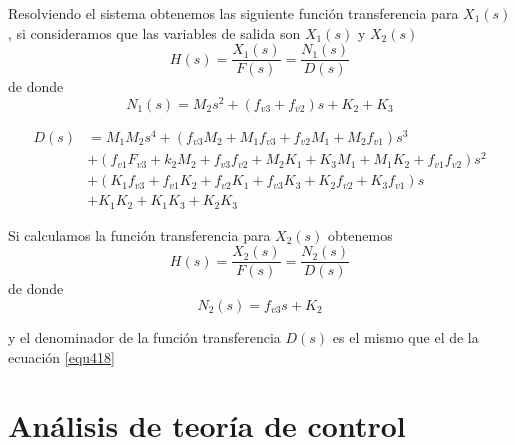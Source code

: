 \documentclass[12pt]{book}
\theoremstyle{definition}
\theoremstyle{remark}
\theoremstyle{plain}
\begin{document}
Resolviendo el sistema obtenemos las siguiente función transferencia para $X_1(s)$, si consideramos que  las variables de salida son $X_1(s)$ y $X_2(s)$
\begin{equation}
\label{euq416}
H(s)= \frac{X_1(s)}{F(s)}=\frac{N_1(s)}{D(s)}
\end{equation}
de donde
\begin{equation}
N_1(s)= M_2 s^2+(f_{v3}+f_{v2}) s +K_2+K_3
\end{equation}

\begin{equation}
\label{equ418}
\begin{split}
D(s) &= M_1 M_2 s^4 + (f_{v3} M_2+M_1 f_{v3}+f_{v2}M_1+M_2 f_{v1}) s^3 \\
&+ (f_{v1}F_{v3} +k_2 M_2+f_{v3}f_{v2}+M_2 K_1+K_3 M_1+M_1 K_2+f_{v1} f_{v2}) s^2 \\
&+(K_1 f_{v3}+f_{v1} K_2+f_{v2} K_1 +f_{v3} K_3+K_2 f_{v2}+K_3 f_{v1}) s \\
&+K_1 K_2+K_1 K_3+K_2 K_3
\end{split}
\end{equation}

Si calculamos la función transferencia para $X_2(s)$ obtenemos
\begin{equation}
\label{euq417}
H(s)= \frac{X_2(s)}{F(s)}=\frac{N_2(s)}{D(s)}
\end{equation}
de donde
\begin{equation}
N_2(s)= f_{v3} s +K_2
\end{equation}

y el denominador de la función transferencia $D(s)$ es el mismo que el de la ecuación \ref{equ418}

\chapter{Análisis de teoría de control}

\backmatter
\end{document}

